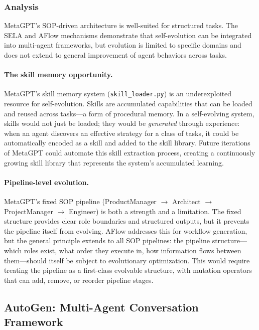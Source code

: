 \subsubsection{Analysis}

MetaGPT's SOP-driven architecture is well-suited for structured tasks. The SELA and AFlow mechanisms demonstrate that self-evolution can be integrated into multi-agent frameworks, but evolution is limited to specific domains and does not extend to general improvement of agent behaviors across tasks.

\paragraph{The skill memory opportunity.}
MetaGPT's skill memory system (\texttt{skill\_loader.py}) is an underexploited resource for self-evolution. Skills are accumulated capabilities that can be loaded and reused across tasks---a form of procedural memory. In a self-evolving system, skills would not just be loaded; they would be \emph{generated} through experience: when an agent discovers an effective strategy for a class of tasks, it could be automatically encoded as a skill and added to the skill library. Future iterations of MetaGPT could automate this skill extraction process, creating a continuously growing skill library that represents the system's accumulated learning.

\paragraph{Pipeline-level evolution.}
MetaGPT's fixed SOP pipeline (ProductManager $\to$ Architect $\to$ ProjectManager $\to$ Engineer) is both a strength and a limitation. The fixed structure provides clear role boundaries and structured outputs, but it prevents the pipeline itself from evolving. AFlow addresses this for workflow generation, but the general principle extends to all SOP pipelines: the pipeline structure---which roles exist, what order they execute in, how information flows between them---should itself be subject to evolutionary optimization. This would require treating the pipeline as a first-class evolvable structure, with mutation operators that can add, remove, or reorder pipeline stages.


\subsection{AutoGen: Multi-Agent Conversation Framework}


